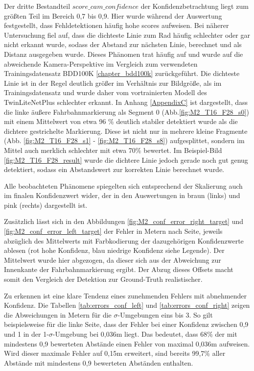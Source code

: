     Der dritte Bestandteil $score\_cam\_confidence$ der Konfidenzbetrachtung liegt zum grö{\ss}ten Teil im Bereich 0,7 bis 0,9. Hier wurde während der Auswertung festgestellt, dass Fehldetektionen häufig hohe scores aufweisen. 
    Bei näherer Untersuchung fiel auf, dass die dichteste Linie zum Rad häufig schlechter oder gar nicht erkannt wurde, sodass der Abstand zur nächsten Linie, berechnet und als Distanz ausgegeben wurde.
    Dieses Phänomen trat häufig auf und wurde auf die abweichende Kamera-Perspektive im Vergleich zum verwendeten Trainingsdatensatz BDD100K \ref{chapter_bdd100k} zurückgeführt. 
    Die dichteste Linie ist in der Regel deutlich grö{\ss}er im Verhältnis zur Bildgrö{\ss}e, als im Trainingsdatensatz und wurde daher vom vortrainierten Modell des TwinLiteNetPlus schlechter erkannt. %
    In Anhang \ref{AppendixC} ist dargestellt, dass die linke äu{\ss}ere Fahrbahnmarkierung als Segment 0 (Abb.\ref{fig:M2_T16_F28_s0}) mit einem Mittelwert von etwa 96 \% deutlich stabiler detektiert wurde als die dichtere gestrichelte Markierung. Diese ist nicht nur in mehrere kleine Fragmente (Abb. \ref{fig:M2_T16_F28_s1} - \ref{fig:M2_T16_F28_s8}) aufgesplittet, sondern im Mittel auch merklich schlechter mit etwa 70\% bewertet.
    Im Beispiel-Bild \ref{fig:M2_T16_F28_result} wurde die dichtere Linie jedoch gerade noch gut genug detektiert, sodass ein Abstandswert zur korrekten Linie berechnet wurde.

    Alle beobachteten Phänomene spiegelten sich entsprechend der Skalierung auch im finalen Konfidenzwert wider, der in den Auswertungen in braun (links) und pink (rechts) dargestellt ist.

    Zusätzlich lässt sich in den Abbildungen \ref{fig:M2_conf_error_right_target} und \ref{fig:M2_conf_error_left_target} der Fehler in Metern nach Seite, jeweils abzüglich des Mittelwerts mit Farbkodierung der dazugehörigen Konfidenzwerte ablesen (rot hohe Konfidenz, blau niedrige Konfidenz siehe Legende).
    Der Mittelwert wurde hier abgezogen, da dieser sich aus der Abweichung zur Innenkante der Fahrbahnmarkierung ergibt. Der Abzug dieses Offsets macht somit den Vergleich der Detektion zur Ground-Truth realistischer.

    Zu erkennen ist eine klare Tendenz eines zunehmenden Fehlers mit abnehmender Konfidenz. Die Tabellen \ref{tab:errors_conf_left} und \ref{tab:errors_conf_right} zeigen die Abweichungen in Metern für die $\sigma$-Umgebungen eins bis 3.
    So gilt beispielsweise für die linke Seite, dass der Fehler bei einer Konfidenz zwischen 0,9 und 1 in der 1-$\sigma$-Umgebung bei 0,036m liegt. Das bedeutet, dass 68\% der mit mindestens 0,9 bewerteten Abstände einen Fehler von maximal 0,036m aufweisen. Wird dieser maximale Fehler auf 0,15m erweitert, sind bereits 99,7\% aller Abstände mit mindestens 0,9 bewerteten Abständen enthalten.

